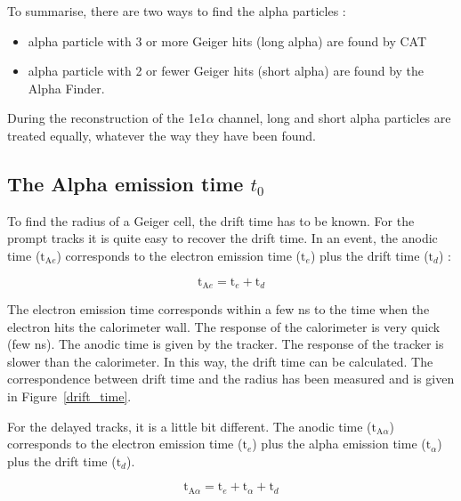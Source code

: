 \documentclass[main.tex]{subfiles}
\begin{document}
\bigskip


\NI To summarise, there are two ways to find the alpha particles :



\begin{itemize}
\item alpha particle with 3 or more Geiger hits (long alpha)  are found by CAT
\item alpha particle with 2 or fewer Geiger hits (short alpha) are found by the Alpha Finder.
\end{itemize} 


\noindent During the reconstruction of the 1e1$\alpha$ channel, long and short alpha particles are treated equally, whatever the way they have been found.

  
\subsection{The Alpha emission time $t_0$}


To find the radius of a Geiger cell, the drift time has to be known. For the prompt tracks it is quite easy to recover the drift time. In an event, the anodic time ($\text{t}_{\text{A}e}$) corresponds to the electron emission time ($ \text{t}_e$) plus the drift time ($\text{t}_d$) :


$$\text{t}_{\text{A}e} = \text{t}_e + \text{t}_d$$


\noindent The electron emission time corresponds within a few ns to the time when the electron hits the calorimeter wall. The response of the calorimeter is very quick (few ns). The anodic time is given by the tracker. The response of the tracker is slower than the calorimeter. In this way, the drift time can be calculated. The correspondence between drift time and the radius has been measured and is given in Figure~\ref{drift_time}.


\bigskip


\noindent For the delayed tracks, it is a little bit different. The anodic time ($\text{t}_{\text{A}\alpha}$) corresponds to the electron emission time ($ \text{t}_e$) plus the alpha emission time ($ \text{t}_\alpha$) plus the drift time ($\text{t}_d$). 


$$\text{t}_{\text{A}\alpha} = \text{t}_e + \text{t}_\alpha + \text{t}_d$$
\end{document}

